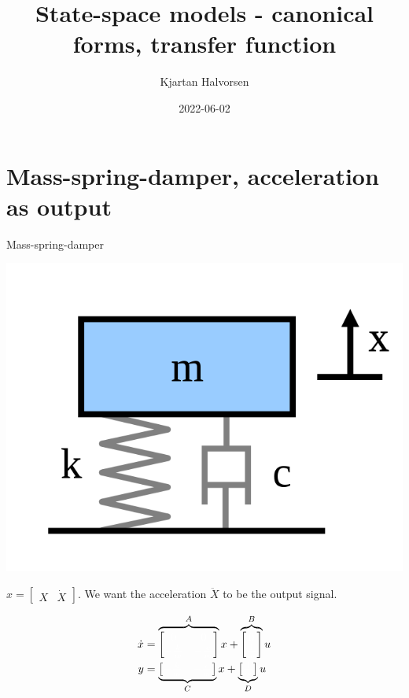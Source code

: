 \documentclass[presentation,aspectratio=169]{beamer}
\author{Kjartan Halvorsen}
\date{2022-06-02}
\title{State-space models  - canonical forms, transfer function}
\begin{document}
\maketitle

\section{Mass-spring-damper, acceleration as output}
\label{sec:org8d33a0e}
\begin{frame}[label={sec:org8403af4}]{Mass-spring-damper}
\begin{center}
\includegraphics[width=0.2\linewidth]{../../figures/mass-spring-damper.png}
\end{center}

\(x = \begin{bmatrix} X & \dot{X} \end{bmatrix}\). We want the acceleration \(\ddot{X}\) to be the output signal.

\begin{center}
\Large
\begin{align*}
  \dot{x} &= \overbrace{\begin{bmatrix} \textcolor{white}{0} & \textcolor{white}{0}\\ \textcolor{white}{-\frac{k}{m}}  & \textcolor{white}{-\frac{c}{m}} \end{bmatrix}}^A x  + \overbrace{\begin{bmatrix} \textcolor{white}{0} \\ \textcolor{white}{\frac{1}{m}} \end{bmatrix}}^B  u \\
       y &=  \underbrace{\begin{bmatrix} \textcolor{white}{-\frac{k}{m}}  & \textcolor{white}{-\frac{c}{m}} \end{bmatrix}}_C x + \underbrace{\begin{bmatrix} \textcolor{white}{\frac{1}{m}} \end{bmatrix}}_D u
\end{align*}

\end{center}
\end{frame}
\end{document}
